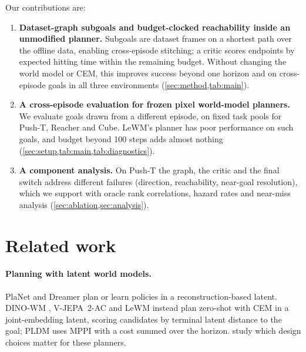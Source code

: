 \documentclass{article} %
\newcommand{\keypoints}[1]{\par\medskip\noindent\fcolorbox{black!50}{black!5}{\begin{minipage}{0.96\linewidth}\small
\textbf{Key points this section must land.}\begin{itemize}[nosep,leftmargin=1.2em]#1\end{itemize}\end{minipage}}\par\medskip}
\begin{document}
Our contributions are:
\begin{enumerate}[nosep,leftmargin=*]
  \item \textbf{Dataset-graph subgoals and budget-clocked reachability inside an unmodified
        planner.} Subgoals are dataset frames on a shortest path over the offline data, enabling
        cross-episode stitching; a critic scores endpoints by expected hitting time within the
        remaining budget. Without changing the world model or CEM, this improves success beyond
        one horizon and on cross-episode goals in all three environments
        (\cref{sec:method,tab:main}).
  \item \textbf{A cross-episode evaluation for frozen pixel world-model planners.} We evaluate
        goals drawn from a different episode, on fixed task pools for Push-T, Reacher and Cube.
        LeWM's planner has poor performance on such goals, and budget beyond 100 steps adds
        almost nothing (\cref{sec:setup,tab:main,tab:diagnostics}).
  \item \textbf{A component analysis.} On Push-T the graph, the critic and the final switch
        address different failures (direction, reachability, near-goal resolution), which we
        support with oracle rank correlations, hazard rates and near-miss analysis
        (\cref{sec:ablation,sec:analysis}).
\end{enumerate}

\section{Related work}
\label{sec:related}

\paragraph{Planning with latent world models.}
PlaNet and Dreamer \citep{planet,dreamerv3} plan or learn policies in a reconstruction-based
latent. DINO-WM \citep{dinowm}, V-JEPA~2-AC \citep{vjepa2} and LeWM \citep{lewm} instead plan
zero-shot with CEM in a joint-embedding latent, scoring candidates by terminal latent distance to
the goal; PLDM \citep{pldm} uses MPPI with a cost summed over the horizon. \citet{jepawm-study}
study which design choices matter for these planners.
\end{document}
